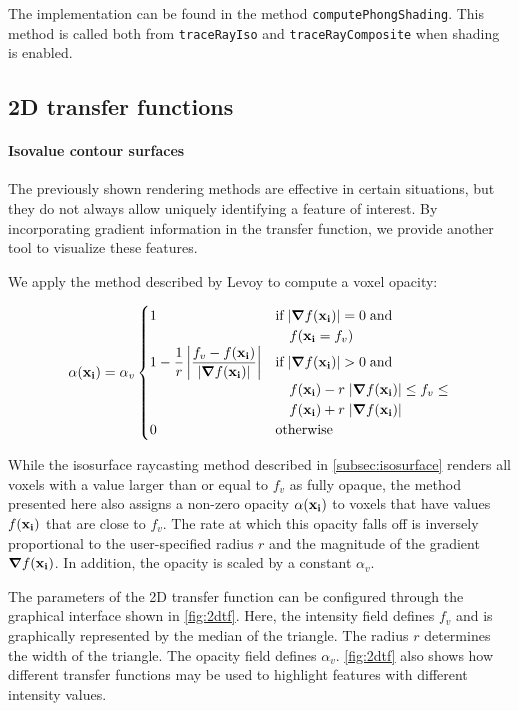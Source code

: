\documentclass[a4paper]{article}
\begin{document}
The implementation can be found in the method {\tt computePhongShading}. This method is called both from {\tt traceRayIso} and {\tt traceRayComposite} when shading is enabled.

\subsection{2D transfer functions}

\paragraph{Isovalue contour surfaces}

The previously shown rendering methods are effective in certain situations, but they do not always allow uniquely identifying a feature of interest. By incorporating gradient information in the transfer function, we provide another tool to visualize these features.

We apply the method described by Levoy\citep{levoy_1988} to compute a voxel opacity:

\begin{equation*}
\alpha(\vb{x_i}) = \alpha_v
\begin{cases}
  1 &\text{if}\;|\grad f(\vb{x_i})| = 0\;\text{and}\\
  &\quad f(\vb{x_i} = f_v)\\
  1 - \dfrac{1}{r} \left| \dfrac{f_v - f(\vb{x_i})}{|\grad f(\vb{x_i})|}\right| &\text{if}\; |\grad f(\vb{x_i})| > 0\;\text{and}\;\\
  &\quad f(\vb{x_i}) - r\; |\grad f(\vb{x_i})| \leq f_v \leq\\
  &\quad f(\vb{x_i}) + r\; |\grad f(\vb{x_i})|\\
  0 &\text{otherwise}
\end{cases}
\end{equation*}

While the isosurface raycasting method described in \autoref{subsec:isosurface} renders all voxels with a value larger than or equal to $f_v$ as fully opaque, the method presented here also assigns a non-zero opacity $\alpha(\vb{x_i})$ to voxels that have values $f(\vb{x_i})$ that are close to $f_v$. The rate at which this opacity falls off is inversely proportional to the user-specified radius $r$ and the magnitude of the gradient $\grad f(\vb{x_i})$. In addition, the opacity is scaled by a constant $\alpha_v$.

The parameters of the 2D transfer function can be configured through the graphical interface shown in \autoref{fig:2dtf}. Here, the intensity field defines $f_v$ and is graphically represented by the median of the triangle. The radius $r$ determines the width of the triangle. The opacity field defines $\alpha_v$. \autoref{fig:2dtf} also shows how different transfer functions may be used to highlight features with different intensity values.
\end{document}
